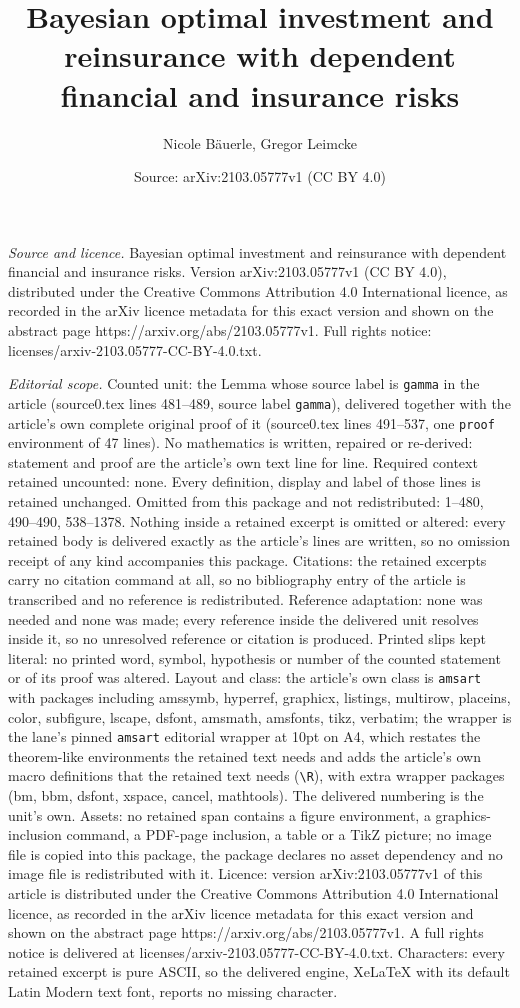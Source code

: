 \documentclass[10pt,a4paper]{amsart}
\title[Bayesian optimal investment and reinsurance with dependent f]{Bayesian optimal investment and reinsurance with dependent financial and insurance risks}
\author{Nicole B\"auerle, Gregor Leimcke}
\date{Source: arXiv:2103.05777v1 (CC BY 4.0)}
\begin{document}
\maketitle

\noindent\emph{Source and licence.} Bayesian optimal investment and reinsurance with dependent financial and insurance risks. Version arXiv:2103.05777v1 (CC BY 4.0), distributed under the Creative Commons Attribution 4.0 International licence, as recorded in the arXiv licence metadata for this exact version and shown on the abstract page https://arxiv.org/abs/2103.05777v1. Full rights notice: licenses/arxiv-2103.05777-CC-BY-4.0.txt.\par\smallskip

\noindent\textit{Editorial scope.} Counted unit: the Lemma whose source label is \texttt{gamma} in the article (source0.tex lines 481--489, source label \texttt{gamma}), delivered together with the article's own complete original proof of it (source0.tex lines 491--537, one \texttt{proof} environment of 47 lines). No mathematics is written, repaired or re-derived: statement and proof are the article's own text line for line. Required context retained uncounted: none. Every definition, display and label of those lines is retained unchanged. Omitted from this package and not redistributed: 1--480, 490--490, 538--1378. Nothing inside a retained excerpt is omitted or altered: every retained body is delivered exactly as the article's lines are written, so no omission receipt of any kind accompanies this package. Citations: the retained excerpts carry no citation command at all, so no bibliography entry of the article is transcribed and no reference is redistributed. Reference adaptation: none was needed and none was made; every reference inside the delivered unit resolves inside it, so no unresolved reference or citation is produced. Printed slips kept literal: no printed word, symbol, hypothesis or number of the counted statement or of its proof was altered. Layout and class: the article's own class is \texttt{amsart} with packages including amssymb, hyperref, graphicx, listings, multirow, placeins, color, subfigure, lscape, dsfont, amsmath, amsfonts, tikz, verbatim; the wrapper is the lane's pinned \texttt{amsart} editorial wrapper at 10pt on A4, which restates the theorem-like environments the retained text needs and adds the article's own macro definitions that the retained text needs (\texttt{\textbackslash R}), with extra wrapper packages (bm, bbm, dsfont, xspace, cancel, mathtools). The delivered numbering is the unit's own. Assets: no retained span contains a figure environment, a graphics-inclusion command, a PDF-page inclusion, a table or a TikZ picture; no image file is copied into this package, the package declares no asset dependency and no image file is redistributed with it. Licence: version arXiv:2103.05777v1 of this article is distributed under the Creative Commons Attribution 4.0 International licence, as recorded in the arXiv licence metadata for this exact version and shown on the abstract page https://arxiv.org/abs/2103.05777v1. A full rights notice is delivered at licenses/arxiv-2103.05777-CC-BY-4.0.txt. Characters: every retained excerpt is pure ASCII, so the delivered engine, XeLaTeX with its default Latin Modern text font, reports no missing character.
\end{document}

